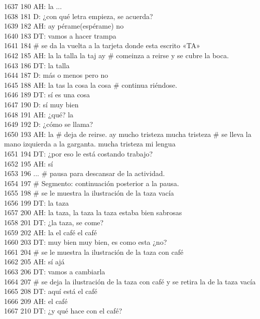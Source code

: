 1637 180 AH: la ...\\
1638 181 D: ¿con qué letra empieza, se acuerda?\\
1639 182 AH: ay pérame(espérame) no\\
1640 183 DT: vamos a hacer trampa\\
1641 184 # se da la vuelta a la tarjeta donde esta escrito «TA»\\
1642 185 AH: la la talla la taj ay # comeinza a reirse y se cubre la boca.\\
1643 186 DT: la talla\\
1644 187 D: más o menos pero no\\
1645 188 AH: la tas la cosa la cosa # continua riéndose.\\
1646 189 DT: sí es una cosa\\
1647 190 D: sí muy bien\\
1648 191 AH: ¿qué? la\\
1649 192 D: ¿cómo se llama?\\
1650 193 AH: la # deja de reirse. ay mucho tristeza mucha tristeza # se lleva la mano izquierda a la garganta. mucha tristeza mi lengua\\
1651 194 DT: ¿por eso le está costando trabajo?\\
1652 195 AH: sí\\
1653 196 ... # pausa para descansar de la actividad.\\
1654 197 # Segmento: continuación posterior a la pausa.\\
1655 198 # se le muestra la ilustración de la taza vacía\\
1656 199 DT: la taza\\
1657 200 AH: la taza, la taza la taza estaba bien sabrosas\\
1658 201 DT: ¿la taza, se come?\\
1659 202 AH: la el café el café\\
1660 203 DT: muy bien muy bien, es como esta ¿no?\\
1661 204 # se le muestra la ilustración de la taza con café\\
1662 205 AH: sí ajá\\
1663 206 DT: vamos a cambiarla\\
1664 207 # se deja la ilustración de la taza con café y se retira la de la taza vacía\\
1665 208 DT: aquí está el café\\
1666 209 AH: el café\\
1667 210 DT: ¿y qué hace con el café?\\

